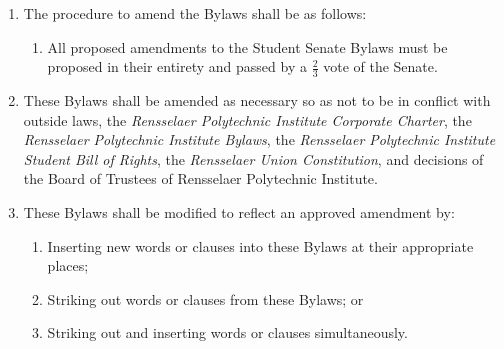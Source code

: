 \begin{enumerate}
\item The procedure to amend the Bylaws shall be as follows:
\begin{enumerate}
\item All proposed amendments to the Student Senate Bylaws must be proposed in their entirety and passed by a $\frac{2}{3}$ vote of the
Senate.
\end{enumerate}

\item These Bylaws shall be amended as necessary so as not to be in conflict with outside laws, the \textit{Rensselaer Polytechnic Institute Corporate Charter}, the \textit{Rensselaer Polytechnic Institute Bylaws}, the \textit{Rensselaer Polytechnic Institute Student Bill of Rights}, the \textit{Rensselaer Union Constitution}, and decisions of the Board of Trustees of Rensselaer Polytechnic Institute.

\item These Bylaws shall be modified to reflect an approved amendment by:
\begin{enumerate}
\item Inserting new words or clauses into these Bylaws at their appropriate places;
\item Striking out words or clauses from these Bylaws; or
\item Striking out and inserting words or clauses simultaneously.
\end{enumerate}
\end{enumerate}
